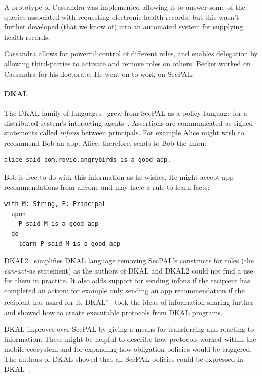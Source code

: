 \documentclass[thesis.tex]{subfiles}
\begin{document}
A prototype of Cassandra was implemented allowing it to answer some of the queries
associated with requesting electronic health records, but this wasn't further
developed (that we know of) into an automated system for supplying health records.

Cassandra allows for powerful control of different roles, and enables
delegation by allowing third-parties to activate and remove roles
on others.  
Becker worked on Cassandra for his doctorate.  He went on to work on SecPAL.

\paragraph*{DKAL}
The DKAL family of
languages~\cite{jeannin_dkal*:_2013,gurevich_dkal:_2008,yuri_gurevich_dkal2---simplified_2009}
grew from SecPAL as a policy language for a distributed system's
interacting agents~\cite{blass_introduction_2012}. Assertions are
communicated as signed statements called \emph{infons} between
principals. For example Alice might wish to recommend Bob an
app. Alice, therefore, sends to Bob the infon:

\begin{lstlisting}
alice said com.rovio.angrybirds is a good app.
\end{lstlisting}

Bob is free to do with this information as he wishes. He might accept
app recommendations from anyone and may have a rule to learn facts:

\noindent\begin{minipage}{\textwidth}
\begin{lstlisting}
with M: String, P: Principal
  upon
    P said M is a good app
  do
    learn P said M is a good app
\end{lstlisting}
\end{minipage}

DKAL2~\cite{yuri_gurevich_dkal2---simplified_2009} simplifies DKAL
language removing SecPAL's constructs for roles (the \emph{can-act-as} statement)
as the authors of DKAL and DKAL2 could not find a use for them in practice.  It also adds
support for sending infons if the recipient has completed an action:
for example only sending an app recommendation if the recipient has
asked for it.
DKAL\textsuperscript{$\star$}~\cite{jeannin_dkal*:_2013} took the ideas of information sharing
further and showed how to create executable protocols from DKAL programs.

DKAL improves over SecPAL by giving a means for transferring and
reacting to information. These might be helpful to describe how
protocols worked within the mobile ecosystem and for expanding how
obligation policies would be triggered.  The authors of DKAL showed
that all SecPAL policies could be expressed in
DKAL~\cite{gurevich_dkal:_2008}. 
\end{document}
